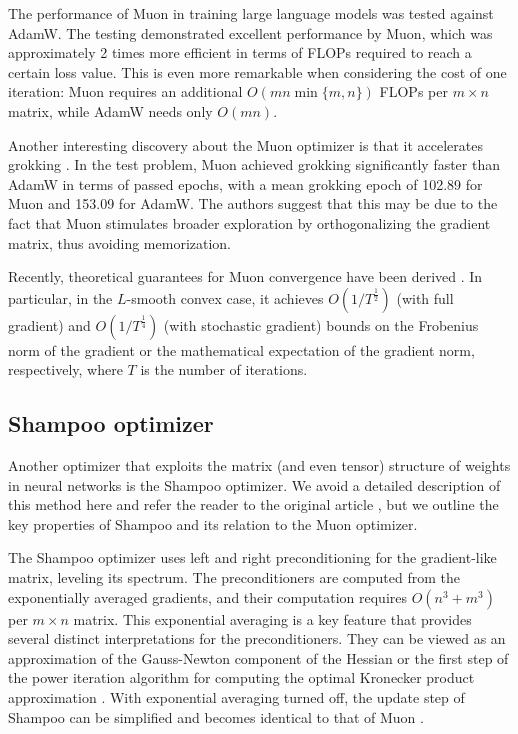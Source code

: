 \documentclass{article} %
\begin{document}
The performance of Muon in training large language models was tested \cite{liu2025muon} against AdamW. The testing demonstrated excellent performance by Muon, which was approximately 2 times more efficient in terms of FLOPs required to reach a certain loss value. This is even more remarkable when considering the cost of one iteration: Muon requires an additional $O(mn \min\{m, n\})$ FLOPs per $m \times n$ matrix, while AdamW needs only $O(mn)$.

Another interesting discovery about the Muon optimizer is that it accelerates grokking \cite{tveit2025muonoptimizeracceleratesgrokking}. In the test problem, Muon achieved grokking significantly faster than AdamW in terms of passed epochs, with a mean grokking epoch of 102.89 for Muon and 153.09 for AdamW. The authors suggest that this may be due to the fact that Muon stimulates broader exploration by orthogonalizing the gradient matrix, thus avoiding memorization.

Recently, theoretical guarantees for Muon convergence have been derived \cite{li2025noteconvergencemuon}. In particular, in the $L$-smooth convex case, it achieves $O(1/T^{\frac{1}{2}})$ (with full gradient) and $O(1/T^{\frac{1}{4}})$ (with stochastic gradient) bounds on the Frobenius norm of the gradient or the mathematical expectation of the gradient norm, respectively, where $T$ is the number of iterations.

\subsection{Shampoo optimizer}

Another optimizer that exploits the matrix (and even tensor) structure of weights in neural networks is the Shampoo optimizer. We avoid a detailed description of this method here and refer the reader to the original article \cite{gupta2018shampoopreconditionedstochastictensor}, but we outline the key properties of Shampoo and its relation to the Muon optimizer.

The Shampoo optimizer uses left and right preconditioning for the gradient-like matrix, leveling its spectrum. The preconditioners are computed from the exponentially averaged gradients, and their computation requires $O(n^3 + m^3)$ per $m \times n$ matrix. This exponential averaging is a key feature that provides several distinct interpretations for the preconditioners. They can be viewed as an approximation of the Gauss-Newton component of the Hessian or the first step of the power iteration algorithm for computing the optimal Kronecker product approximation \cite{morwani2025a}. With exponential averaging turned off, the update step of Shampoo can be simplified and becomes identical to that of Muon \cite{jordan2024muon}.
\end{document}
